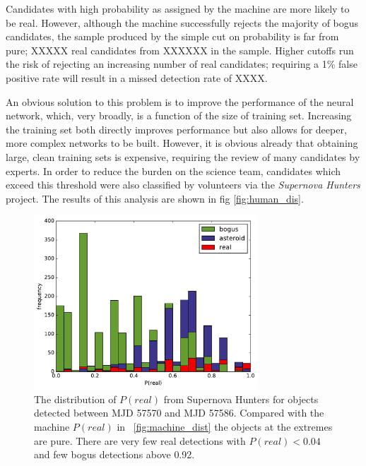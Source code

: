 \documentclass[a4paper,fleqn,usenatbib]{mnras}
\begin{document}
Candidates with high probability as assigned by the machine are more likely to be real. However, although the machine successfully rejects the majority of bogus candidates, the sample produced by the simple cut on probability is far from pure; XXXXX real candidates from XXXXXX in the sample. Higher cutoffs run the risk of rejecting an increasing number of real candidates; requiring a 1\% false positive rate will result in a missed detection rate of XXXX. 

An obvious solution to this problem is to improve the performance of the neural network, which, very broadly, is a function of the size of training set. Increasing the training set both directly improves performance but also allows for deeper, more complex networks to be built. However, it is obvious already that obtaining large, clean training sets is expensive, requiring the review of many candidates by experts. In order to reduce the burden on the science team, candidates which exceed this threshold were also classified by volunteers via the \emph{Supernova Hunters} project. The results of this analysis are shown in fig \ref{fig:human_dis}. 

\begin{figure}
   \includegraphics[width=84mm]{figs/human_hist.pdf}
   \caption{The distribution of $P(real)$ from Supernova Hunters for objects detected between 
            MJD 57570 and MJD 57586.  Compared with the machine $P(real)$ in ~\ref{fig:machine_dist}
            the objects at the extremes are pure.  There are very few real detections with 
            $P(real) < 0.04$ and few bogus detections above 0.92.} 
   \label{fig:human_dist} 
\end{figure}
\end{document}
